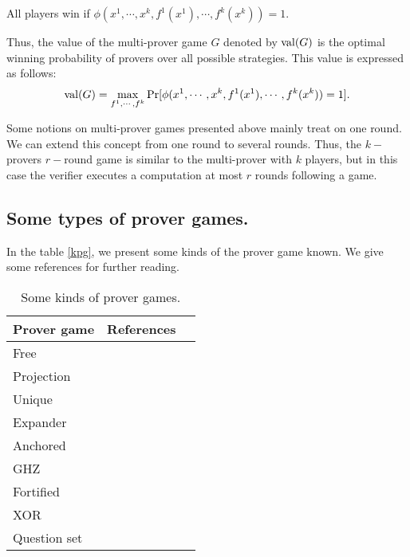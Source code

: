 All players win if $\phi (x^1, \cdots , x^k, f^1(x^1), \cdots , f^k(x^k))=1.$ 

Thus, the value of the multi-prover game $G$ denoted by $\mathrm{val} (G)$ is  the optimal winning probability of provers over all possible strategies. This value is expressed as follows:
$$\mathrm{val} (G)= \max_{f^1, \cdots , f^k} \Pr[\phi (x^1, \cdots , x^k, f^1(x^1), \cdots , f^k(x^k))=1].$$


Some notions on multi-prover games presented above  mainly treat on one round. We can extend this concept from one round to several rounds. Thus, the $k-$provers $r-$round game is similar to the multi-prover with $k$ players, but in this case the verifier executes a computation at most $r$ rounds following a game. 


\subsection{Some types of prover games.}

In the table \eqref{kpg}, we present some kinds of the prover game known. We give some references for further reading.

\begin{table}[h]
\begin{center}
\begin{tabular}{lll}
\hline 
\textbf{Prover game} &  \textbf{References} \\ 
\hline 
Free & \cite{verbitsky1996towards} \\ Projection & \cite{rao2011parallel} \\ Unique &\cite{tamaki2015parallel}  \\ Expander & \cite{dinur2016multiplayer} \\ Anchored & \cite{bavarian2015anchoring} \\ GHZ & \cite{dinur2016multiplayer} \\ Fortified & \cite{moshkovitz2014parallel} \\ XOR & \cite{cleve2007perfect} \\ Question set & \cite{hkazla2016forbidden}\\
\hline 
\end{tabular} 
\end{center}
\caption{Some kinds of prover games.} \label{kpg}
\end{table}



